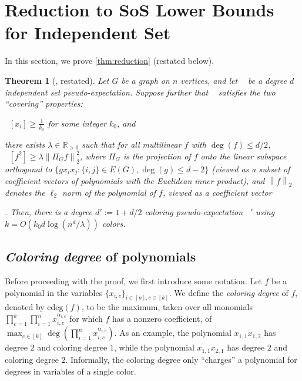 \documentclass[10pt,a4paper]{article}
\newtheorem*{theorem*}{Theorem}
\theoremstyle{definition}
\newcommand{\R}{\mathbb R}
\DeclareMathOperator{\pE}{\tilde{\mathbb{E}}}
\def\norm#1{\left\| #1 \right\|}
\newcommand{\cdeg}{\mathrm{cdeg}}
\newcommand{\numcolors}{k}
\newcommand{\numlb}{k_0}
\begin{document}
\section{Reduction to SoS Lower Bounds for Independent Set}
\label{sec:mainanalysis}

In this section, we prove \cref{thm:reduction} (restated below).

\begin{theorem*}[, restated]
Let $G$ be a graph on $n$ vertices, and let $\pE$ be a degree $d$ independent set pseudo-expectation. Suppose further that $\pE$ satisfies the two ``covering'' properties: \begin{inparaenum}[(1)] \item $\pE[x_i] \geq \frac{1}{\numlb}$ for some integer $\numlb$, and \item there exists $\lambda \in \R_{> 0}$ such that for all multilinear $f$ with $\deg(f) \leq d/2$, $\pE[f^2] \geq \lambda \norm{\Pi_G f}_2^2$, where $\Pi_G$ is the projection of $f$ onto the linear subspace orthogonal to $\{g x_i x_j : \{i,j\} \in E(G), \deg(g) \leq d-2\}$ (viewed as a subset of coefficient vectors of polynomials with the Euclidean inner product), and $\norm{f}_2$ denotes the $\ell_2$ norm of the polynomial of $f$, viewed as a coefficient vector\end{inparaenum}. 
Then, there is a degree $d' := 1 + d/2$ coloring pseudo-expectation $\pE'$ using $\numcolors = O(\numlb d \log (n^d/\lambda))$ colors.
\end{theorem*}



\subsection{\emph{Coloring degree} of polynomials}
Before proceeding with the proof, we first introduce some notation. Let $f$ be a polynomial in the variables $\{x_{i,c}\}_{i \in [n], c \in [\numcolors]}$. We define the \emph{coloring degree} of $f$, denoted by $\cdeg(f)$, to be the maximum, taken over all monomials $\prod_{c = 1}^{\numcolors} \prod_{i = 1}^n x_{i,c}^{\alpha_{i,c}}$ for which $f$ has a nonzero coefficient, of $\max_{c \in [\numcolors]} \deg(\prod_{i = 1}^n x_{i,c}^{\alpha_{i,c}})$. As an example, the polynomial $x_{1,1} x_{1,2}$ has degree $2$ and coloring degree $1$, while the polynomial $x_{1,1} x_{2,1}$ has degree $2$ and coloring degree $2$. Informally, the coloring degree only ``charges'' a polynomial for degrees in variables of a single color. 
\end{document}
